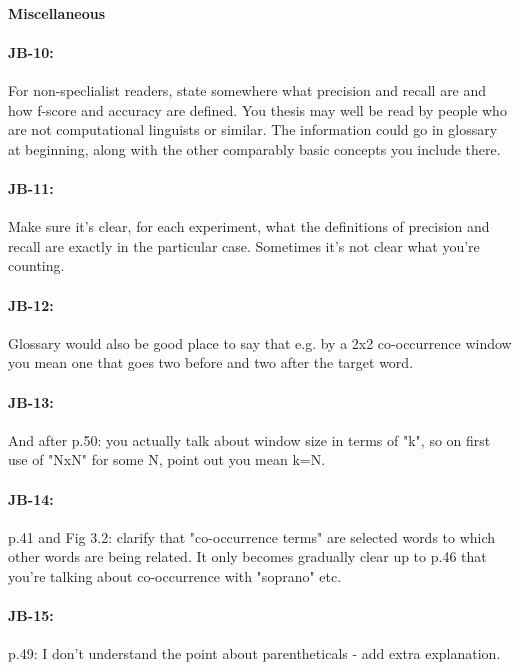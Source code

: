 \documentclass[11pt,a4paper]{article}
\begin{document}
\paragraph{Miscellaneous}

\paragraph{JB-10:} For non-speclialist readers, state somewhere what precision and recall are and how f-score and accuracy are defined. You thesis may well be read by people who are not computational linguists or similar. The information could go in glossary at beginning, along with the other comparably basic concepts you include there.

\paragraph{JB-11:} Make sure it's clear, for each experiment, what the definitions of precision and recall are exactly in the particular case. Sometimes it's not clear what you're counting.

\paragraph{JB-12:} Glossary would also be good place to say that e.g. by a 2x2 co-occurrence window you mean one that goes two before and two after the target word.

\paragraph{JB-13:} And after p.50: you actually talk about window size in terms of "k", so on first use of "NxN" for some N, point out you mean k=N.

\paragraph{JB-14:} p.41 and Fig 3.2: clarify that "co-occurrence terms" are selected words to which other words are being related. It only becomes gradually clear up to p.46 that you're talking about co-occurrence with "soprano" etc.

\paragraph{JB-15:} p.49: I don't understand the point about parentheticals - add extra explanation.
\end{document}
